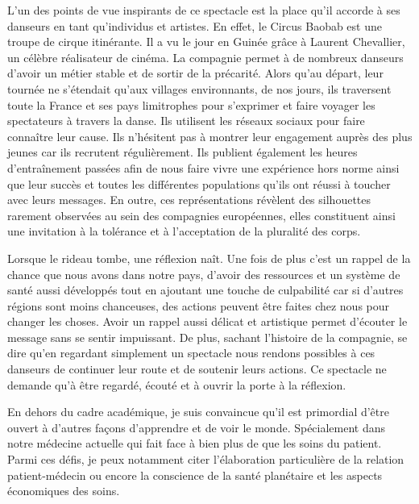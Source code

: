 L’un des points de vue inspirants de ce spectacle est la place qu’il accorde à ses danseurs en tant qu’individus et artistes. En effet, le Circus Baobab est une troupe de cirque itinérante. Il a vu le jour en Guinée grâce à Laurent Chevallier, un célèbre réalisateur de cinéma. La compagnie permet à de nombreux danseurs d’avoir un métier stable et de sortir de la précarité. Alors qu'au départ, leur tournée ne s’étendait qu’aux villages environnants, de nos jours, ils traversent toute la France et ses pays limitrophes pour s’exprimer et faire voyager les spectateurs à travers la danse. Ils utilisent les réseaux sociaux pour faire connaître leur cause. Ils n’hésitent pas à montrer leur engagement auprès des plus jeunes car ils recrutent régulièrement. Ils publient également les heures d’entraînement passées afin de nous faire vivre une expérience hors norme ainsi que leur succès et toutes les différentes populations qu’ils ont réussi à toucher avec leurs messages. En outre, ces représentations révèlent des silhouettes rarement observées au sein des compagnies européennes, elles constituent ainsi une invitation à la tolérance et à l'acceptation de la pluralité des corps.

Lorsque le rideau tombe, une réflexion naît. Une fois de plus c’est un rappel de la chance que nous avons dans notre pays, d'avoir des ressources et un système de santé aussi développés tout en ajoutant une touche de culpabilité car si d’autres régions sont moins chanceuses, des actions peuvent être faites chez nous pour changer les choses. Avoir un rappel aussi délicat et artistique permet d’écouter le message sans se sentir impuissant. De plus, sachant l’histoire de la compagnie, se dire qu’en regardant simplement un spectacle nous rendons possibles à ces danseurs de continuer leur route et de soutenir leurs actions. Ce spectacle ne demande qu’à être regardé, écouté et à ouvrir la porte à la réflexion.

En dehors du cadre académique, je suis convaincue qu’il est primordial d’être ouvert à d’autres façons d’apprendre et de voir le monde. Spécialement dans notre médecine actuelle qui fait face à bien plus de  que les soins du patient. Parmi ces défis, je peux notamment citer l'élaboration particulière de la relation patient-médecin ou encore la conscience de la santé planétaire et les aspects économiques des soins.